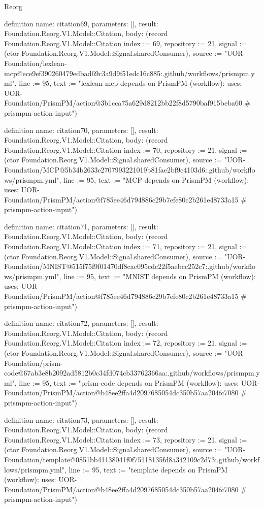 \begin{lexlean}{Reorg}
\begin{semanticmodule}
definition{
  name: citation69,
  parameters: [],
  result: Foundation.Reorg.V1.Model::Citation,
  body: (record Foundation.Reorg.V1.Model::Citation {index := 69, repository := 21, signal := (ctor Foundation.Reorg.V1.Model::Signal.sharedConsumer), source := "UOR-Foundation/lexlean-mcp@ece9ef390260479edbad69c3a9d9f51edc16c885:.github/workflows/prismpm.yml", line := 95, text := "lexlean-mcp depends on PrismPM (workflow): uses: UOR-Foundation/PrismPM/action@3b1cca75a629d8212bb22f8d5790baf915beba60 # prismpm-action-input"})
}

definition{
  name: citation70,
  parameters: [],
  result: Foundation.Reorg.V1.Model::Citation,
  body: (record Foundation.Reorg.V1.Model::Citation {index := 70, repository := 21, signal := (ctor Foundation.Reorg.V1.Model::Signal.sharedConsumer), source := "UOR-Foundation/MCP@5b34b2633e2707993221019b81fae2bf9c4103d6:.github/workflows/prismpm.yml", line := 95, text := "MCP depends on PrismPM (workflow): uses: UOR-Foundation/PrismPM/action@f785ee46d794886c29b7efe80c2b261e48733a15 # prismpm-action-input"})
}

definition{
  name: citation71,
  parameters: [],
  result: Foundation.Reorg.V1.Model::Citation,
  body: (record Foundation.Reorg.V1.Model::Citation {index := 71, repository := 21, signal := (ctor Foundation.Reorg.V1.Model::Signal.sharedConsumer), source := "UOR-Foundation/MNIST@515f75f9f01470df8cac095cdc22f5aebcc252c7:.github/workflows/prismpm.yml", line := 95, text := "MNIST depends on PrismPM (workflow): uses: UOR-Foundation/PrismPM/action@f785ee46d794886c29b7efe80c2b261e48733a15 # prismpm-action-input"})
}

definition{
  name: citation72,
  parameters: [],
  result: Foundation.Reorg.V1.Model::Citation,
  body: (record Foundation.Reorg.V1.Model::Citation {index := 72, repository := 21, signal := (ctor Foundation.Reorg.V1.Model::Signal.sharedConsumer), source := "UOR-Foundation/prism-code@67ab3e8b2092ad5812b0c34fd074cb33762366aa:.github/workflows/prismpm.yml", line := 95, text := "prism-code depends on PrismPM (workflow): uses: UOR-Foundation/PrismPM/action@b48ee2ffa4d2097685054dc350b57aa204fc7080 # prismpm-action-input"})
}

definition{
  name: citation73,
  parameters: [],
  result: Foundation.Reorg.V1.Model::Citation,
  body: (record Foundation.Reorg.V1.Model::Citation {index := 73, repository := 21, signal := (ctor Foundation.Reorg.V1.Model::Signal.sharedConsumer), source := "UOR-Foundation/template@0851bb41138041f0f75118135fd8a342109c2d73:.github/workflows/prismpm.yml", line := 95, text := "template depends on PrismPM (workflow): uses: UOR-Foundation/PrismPM/action@b48ee2ffa4d2097685054dc350b57aa204fc7080 # prismpm-action-input"})
}


\end{semanticmodule}
\end{lexlean}
